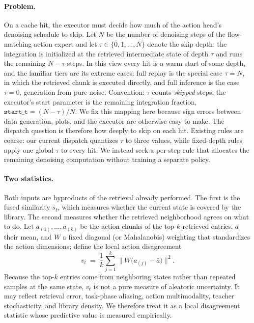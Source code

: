 \documentclass{article}
\begin{document}
\paragraph{Problem.}
On a cache hit, the executor must decide how much of the action head's
denoising schedule to skip. Let $N$ be the number of denoising steps of the
flow-matching action expert and let $\tau \in \{0, 1, \dots, N\}$ denote the
skip depth: the integration is initialized at the retrieved intermediate
state of depth $\tau$ and runs the remaining $N - \tau$ steps. In this view
every hit is a warm start of some depth, and the familiar tiers are its
extreme cases: full replay is the special case $\tau = N$, in which the
retrieved chunk is executed directly, and full inference is the case
$\tau = 0$, generation from pure noise. Convention: $\tau$ counts
\emph{skipped} steps; the executor's start parameter is the remaining
integration fraction, $\mathtt{start\_t} = (N - \tau)/N$. We fix this mapping
here because sign errors between data generation, plots, and the executor are
otherwise easy to make. The dispatch question is therefore how deeply to skip
on each hit. Existing rules are coarse: our current dispatch quantizes $\tau$
to three values, while fixed-depth rules apply one global $\tau$ to every hit.
We instead seek a per-step rule that allocates the remaining denoising
computation without training a separate policy.

\paragraph{Two statistics.}
Both inputs are byproducts of the retrieval already performed. The first is
the fused similarity $s_t$, which measures whether the current state is
covered by the library. The second measures whether the retrieved
neighborhood agrees on what to do. Let $a_{(1)}, \dots, a_{(k)}$ be the
action chunks of the top-$k$ retrieved entries, $\bar{a}$ their mean, and $W$
a fixed diagonal (or Mahalanobis) weighting that standardizes the action
dimensions; define the local action disagreement
\begin{equation}
v_t \;=\; \frac{1}{k}\sum_{j=1}^{k} \bigl\| W\bigl(a_{(j)} - \bar{a}\bigr) \bigr\|^2 .
\label{eq:v}
\end{equation}
Because the top-$k$ entries come from neighboring states rather than repeated
samples at the same state, $v_t$ is not a pure measure of aleatoric
uncertainty. It may reflect retrieval error, task-phase aliasing, action
multimodality, teacher stochasticity, and library density. We therefore treat
it as a local disagreement statistic whose predictive value is measured
empirically.
\end{document}
